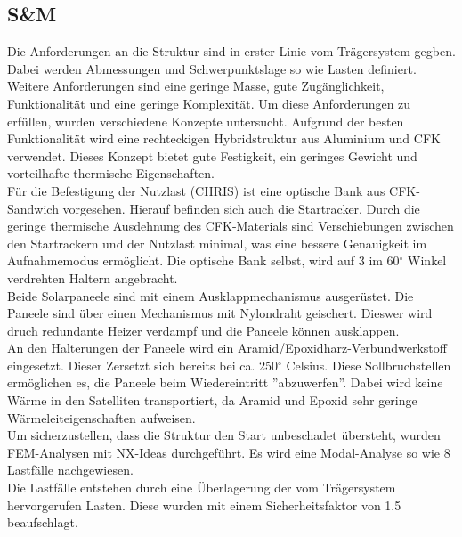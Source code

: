 \documentclass[twoside]{article}
\begin{document}
\begin{multicols}{2}
         \subsection{S\&M}

         Die Anforderungen an die Struktur sind in erster Linie vom Trägersystem gegben. Dabei werden Abmessungen und Schwerpunktslage so wie Lasten definiert. \\
         Weitere Anforderungen sind eine geringe Masse, gute Zugänglichkeit, Funktionalität und eine geringe Komplexität. Um diese Anforderungen zu erfüllen, wurden verschiedene Konzepte untersucht. Aufgrund der besten Funktionalität wird eine rechteckigen Hybridstruktur aus Aluminium und CFK verwendet. Dieses Konzept bietet gute Festigkeit, ein geringes Gewicht und vorteilhafte thermische Eigenschaften.	\\
         Für die Befestigung der Nutzlast (CHRIS) ist eine optische Bank aus CFK-Sandwich vorgesehen. Hierauf befinden sich auch die Startracker. Durch die geringe thermische Ausdehnung des CFK-Materials sind Verschiebungen zwischen den Startrackern und der Nutzlast minimal, was eine bessere Genauigkeit im Aufnahmemodus ermöglicht. Die optische Bank selbst, wird auf 3 im 60$^\circ$ Winkel verdrehten Haltern angebracht.   
         \\
         Beide Solarpaneele sind mit einem Ausklappmechanismus ausgerüstet. Die Paneele sind über einen Mechanismus mit Nylondraht geischert. Dieswer wird druch redundante Heizer verdampf und die Paneele können ausklappen.
         \\
         An den Halterungen der Paneele wird ein Aramid/Epoxidharz-Verbundwerkstoff eingesetzt. Dieser Zersetzt sich bereits bei ca. 250$^\circ$ Celsius. Diese Sollbruchstellen ermöglichen es, die Paneele beim Wiedereintritt ''abzuwerfen''. Dabei wird keine Wärme in den Satelliten transportiert, da Aramid und Epoxid sehr geringe Wärmeleiteigenschaften aufweisen.\\
         Um sicherzustellen, dass die Struktur den Start unbeschadet übersteht, wurden FEM-Analysen mit NX-Ideas durchgeführt. Es wird eine Modal-Analyse so wie 8 Lastfälle nachgewiesen.\\
         Die Lastfälle entstehen durch eine Überlagerung der vom Trägersystem hervorgerufen Lasten. Diese wurden mit einem Sicherheitsfaktor von 1.5 beaufschlagt.\\
         \begin{table}[H]
            \captionsetup{format=plain}
            \centering

\end{table}
\end{multicols}
\end{document}
